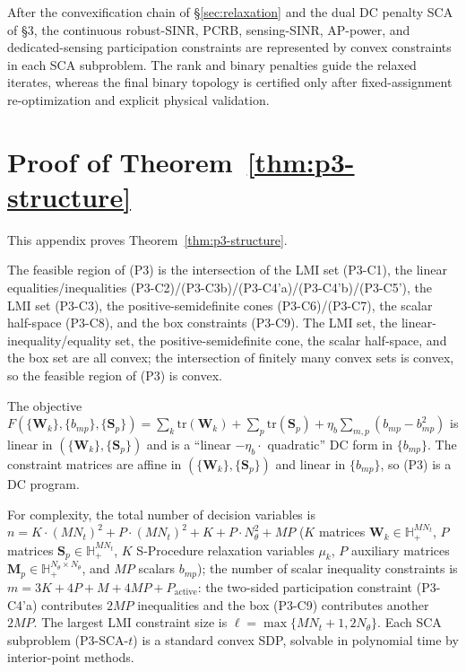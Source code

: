 \documentclass[12pt,a4paper]{article}
\newcommand{\mat}[1]{\mathbf{#1}}
\newcommand{\tr}{\text{tr}}
\begin{document}
After the convexification chain of \S\ref{sec:relaxation} and the dual DC penalty SCA of \S3, the continuous robust-SINR, PCRB, sensing-SINR, AP-power, and dedicated-sensing participation constraints are represented by convex constraints in each SCA subproblem. The rank and binary penalties guide the relaxed iterates, whereas the final binary topology is certified only after fixed-assignment re-optimization and explicit physical validation.



\appendix
\section{Proof of Theorem~\ref{thm:p3-structure}}\label{app:proof-p3}

This appendix proves Theorem~\ref{thm:p3-structure}.

The feasible region of (P3) is the intersection of the LMI set (P3-C1), the linear equalities/inequalities (P3-C2)/(P3-C3b)/(P3-C4'a)/(P3-C4'b)/(P3-C5'), the LMI set (P3-C3), the positive-semidefinite cones (P3-C6)/(P3-C7), the scalar half-space (P3-C8), and the box constraints (P3-C9). The LMI set, the linear-inequality/equality set, the positive-semidefinite cone, the scalar half-space, and the box set are all convex; the intersection of finitely many convex sets is convex, so the feasible region of (P3) is convex.

The objective $F(\{\mat{W}_k\}, \{b_{mp}\}, \{\mat{S}_p\}) = \sum_k \tr(\mat{W}_k) + \sum_p \tr(\mat{S}_p) + \eta_b \sum_{m,p} (b_{mp} - b_{mp}^2)$ is linear in $(\{\mat{W}_k\}, \{\mat{S}_p\})$ and is a ``linear $- \eta_b \cdot$ quadratic'' DC form in $\{b_{mp}\}$. The constraint matrices are affine in $(\{\mat{W}_k\}, \{\mat{S}_p\})$ and linear in $\{b_{mp}\}$, so (P3) is a DC program.

For complexity, the total number of decision variables is $n = K \cdot (MN_t)^2 + P \cdot (MN_t)^2 + K + P \cdot N_\theta^2 + MP$ ($K$ matrices $\mat{W}_k \in \mathbb{H}_+^{MN_t}$, $P$ matrices $\mat{S}_p \in \mathbb{H}_+^{MN_t}$, $K$ S-Procedure relaxation variables $\mu_k$, $P$ auxiliary matrices $\mat{M}_p \in \mathbb{H}_+^{N_\theta \times N_\theta}$, and $MP$ scalars $b_{mp}$); the number of scalar inequality constraints is $m = 3K + 4P + M + 4MP + P_{\text{active}}$: the two-sided participation constraint (P3-C4'a) contributes $2MP$ inequalities and the box (P3-C9) contributes another $2MP$. The largest LMI constraint size is $\ell = \max\{MN_t + 1, 2 N_\theta\}$. Each SCA subproblem (P3-SCA-$t$) is a standard convex SDP, solvable in polynomial time by interior-point methods.
\end{document}
